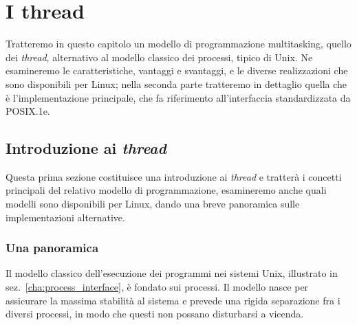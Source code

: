 
\chapter{I thread}
\label{cha:threads}



Tratteremo in questo capitolo un modello di programmazione multitasking,
quello dei \textit{thread}, alternativo al modello classico dei processi,
tipico di Unix. Ne esamineremo le caratteristiche, vantaggi e svantaggi, e le
diverse realizzazioni che sono disponibili per Linux; nella seconda parte
tratteremo in dettaglio quella che è l'implementazione principale, che fa
riferimento all'interfaccia standardizzata da POSIX.1e.


\section{Introduzione ai \textit{thread}}
\label{sec:thread_intro}

Questa prima sezione costituisce una introduzione ai \textit{thread} e
tratterà i concetti principali del relativo modello di programmazione,
esamineremo anche quali modelli sono disponibili per Linux, dando una breve
panoramica sulle implementazioni alternative.


\subsection{Una panoramica}
\label{sec:thread_overview}


Il modello classico dell'esecuzione dei programmi nei sistemi Unix, illustrato
in sez.~\ref{cha:process_interface}, è fondato sui processi. Il modello nasce
per assicurare la massima stabilità al sistema e prevede una rigida
separazione fra i diversi processi, in modo che questi non possano disturbarsi
a vicenda. 


